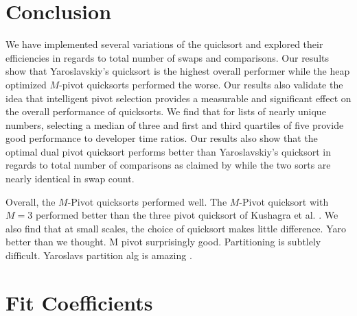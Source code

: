 		

\section{Conclusion}
	\label{sec:Conclusionn}
	We have implemented several variations of the quicksort and explored their efficiencies in regards to total number of swaps and comparisons. Our results show that Yaroslavskiy's quicksort is the highest overall performer while the heap optimized $M$-pivot quicksorts performed the worse. Our results also validate the idea that intelligent pivot selection provides a measurable and significant effect on the overall performance of quicksorts. We find that for lists of nearly unique numbers, selecting a median of three and first and third quartiles of five provide good performance to developer time ratios. Our results also show that the optimal dual pivot quicksort performs better than Yaroslavskiy's quicksort in regards to total number of comparisons as claimed by \cite{Aumuller:2013:OPD:2525857.2525862} while the two sorts are nearly identical in swap count.

	Overall, the $M$-Pivot quicksorts performed well. The $M$-Pivot quicksort with $M=3$ performed better than the three pivot quicksort of Kushagra et al. \cite{kushagra2013multi}. We also find that at small scales, the choice of quicksort makes little difference. 
	Yaro better than we thought. M pivot surprisingly good. Partitioning is subtlely difficult. Yaroslavs partition alg is amazing \cite{Aumuller:2013:OPD:2525857.2525862} \cite{Wild:2012:ACA:2404160.2404231}. 
	




\section{Fit Coefficients}
	\label{sec:FitCoefficients}

